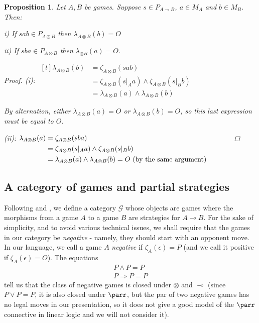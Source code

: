 \documentclass[11pt]{article} %
\theoremstyle{plain} %
\newtheorem{proposition}[theorem]{Proposition}
\theoremstyle{definition} %
\theoremstyle{note}
\theoremstyle{exercisestyle}
\newcommand{\tensor}{\otimes}
\renewcommand{\implies}{\multimap}
\newcommand{\G}{\mathcal G}
\newcommand{\emptyplay}{\epsilon}
\begin{document}
\begin{proposition}
  \label{WhoSwitchesGames}
  Let $A,B$ be games.  Suppose $s\in P_{A\implies B}$, $a\in M_A$ and $b\in M_B$.  Then:

  i) If $sab\in P_{A\tensor B}$ then $\lambda_{A\tensor B}(b)=O$

  ii) If $sba\in P_{A\tensor B}$ then $\lambda_{\tensor B}(a)=O$.  

  \begin{proof}

    (i): $\begin{aligned}[t]
      \lambda_{A\tensor B}(b) & = \zeta_{A\tensor B}(sab) \\
       & = \zeta_{A\tensor B}(s\vert_A a) \wedge \zeta_{A\tensor B}(s\vert_B b) \\
       & = \lambda_{A\tensor B}(a) \wedge \lambda_{A\tensor B}(b)
    \end{aligned}$

    By alternation, either $\lambda_{A\tensor B}(a)=O$ or $\lambda_{A\tensor B}(b)=O$, so this last expression must be equal to $O$.
    
    (ii): \noindent$\begin{aligned}[t]
      \lambda_{A\tensor B}(a) & = \zeta_{A\tensor B}(sba) \\
       & = \zeta_{A\tensor B}(s\vert_A a) \wedge \zeta_{A\tensor B}(s\vert_B b) \\
       & = \lambda_{A\tensor B}(a) \wedge \lambda_{A\tensor B}(b) = O\textrm{ (by the same argument)} && \quad\;\qedhere
    \end{aligned}$
  \end{proof}
\end{proposition}

\subsection{A category of games and partial strategies}
\label{CategoricalSemantics}

Following \cite{joyalgames} and \cite{abramskyjagadeesangames}, we define a category $\G$ whose objects are games where the morphisms from a game $A$ to a game $B$ are strategies for $A\implies B$.  For the sake of simplicity, and to avoid various technical issues, we shall require that the games in our category be \emph{negative} - namely, they should start with an opponent move.  In our language, we call a game $A$ \emph{negative} if $\zeta_A(\emptyplay)=P$ (and we call it positive if $\zeta_A(\emptyplay)=O$).  The equations
\begin{gather*}
  P \wedge P = P \\
  P \Rightarrow P = P
\end{gather*}
tell us that the class of negative games is closed under $\tensor$ and $\implies$ (since $P\vee P=P$, it is also closed under $\parr$, but the par of two negative games has no legal moves in our presentation, so it does not give a good model of the $\parr$ connective in linear logic and we will not consider it).
\end{document}
